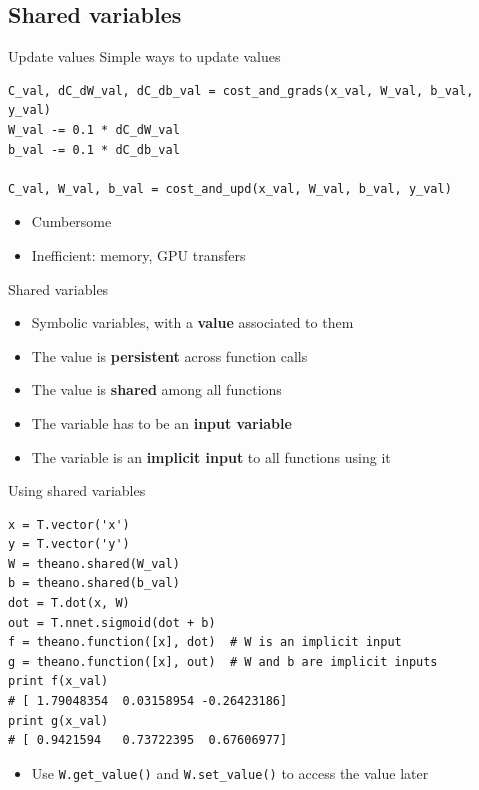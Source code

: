 \documentclass[a4paper,9pt]{beamer}
\begin{document}
\subsection{Shared variables}
\begin{frame}[fragile]{Update values}
  Simple ways to update values
  \begin{verbatim}
C_val, dC_dW_val, dC_db_val = cost_and_grads(x_val, W_val, b_val, y_val)
W_val -= 0.1 * dC_dW_val
b_val -= 0.1 * dC_db_val

C_val, W_val, b_val = cost_and_upd(x_val, W_val, b_val, y_val)
  \end{verbatim}
  \begin{itemize}
    \item Cumbersome
    \item Inefficient: memory, GPU transfers
  \end{itemize}
\end{frame}

\begin{frame}{Shared variables}
  \begin{itemize}
    \item Symbolic variables, with a {\bf value} associated to them
    \item The value is {\bf persistent} across function calls
    \item The value is {\bf shared} among all functions
    \item The variable has to be an {\bf input variable}
    \item The variable is an {\bf implicit input} to all functions using it
  \end{itemize}
\end{frame}

\begin{frame}[fragile]{Using shared variables}
  \begin{verbatim}
x = T.vector('x')
y = T.vector('y')
W = theano.shared(W_val)
b = theano.shared(b_val)
dot = T.dot(x, W)
out = T.nnet.sigmoid(dot + b)
f = theano.function([x], dot)  # W is an implicit input
g = theano.function([x], out)  # W and b are implicit inputs
print f(x_val)
# [ 1.79048354  0.03158954 -0.26423186]
print g(x_val)
# [ 0.9421594   0.73722395  0.67606977]
  \end{verbatim}
  \begin{itemize}
    \item Use \verb|W.get_value()| and \verb|W.set_value()|
      to access the value later
  \end{itemize}
\end{frame}
\end{document}
